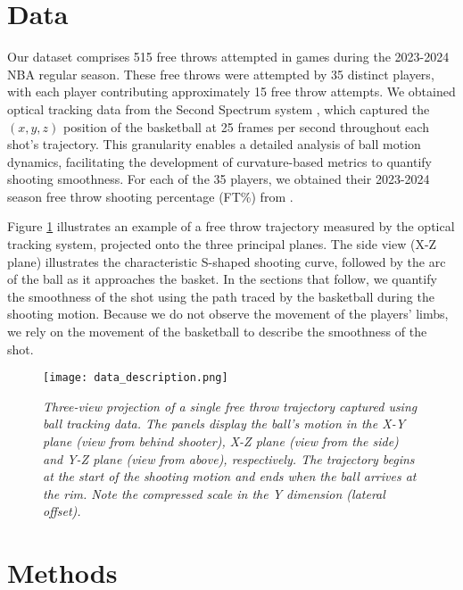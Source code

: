 \documentclass{article}
\begin{document}
  \section{Data}

    Our dataset comprises 515 free throws attempted in games during the 2023-2024 NBA regular season. These free throws were attempted by 35 distinct players, with each player contributing approximately 15 free throw attempts. We obtained optical tracking data from the Second Spectrum system \citep{national_basketball_association_nba_2016}, which captured the $(x, y, z)$ position of the basketball at 25 frames per second throughout each shot's trajectory. This granularity enables a detailed analysis of ball motion dynamics, facilitating the development of curvature-based metrics to quantify shooting smoothness. For each of the 35 players, we obtained their 2023-2024 season free throw shooting percentage (FT\%) from \citet{basketball_reference_2023-24_2024}.

    Figure \ref{fig:data-description} illustrates an example of a free throw trajectory measured by the optical tracking system, projected onto the three principal planes. The side view (X-Z plane) illustrates the characteristic S-shaped shooting curve, followed by the arc of the ball as it approaches the basket. In the sections that follow, we quantify the smoothness of the shot using the path traced by the basketball during the shooting motion. Because we do not observe the movement of the players' limbs, we rely on the movement of the basketball to describe the smoothness of the shot.

    \begin{figure}[H]
        \centering
        \texttt{[image: data\_description.png]}
        \caption{\it Three-view projection of a single free throw trajectory captured using ball tracking data. The panels display the ball's motion in the X-Y plane (view from behind shooter), X-Z plane (view from the side) and Y-Z plane (view from above), respectively. The trajectory begins at the start of the shooting motion and ends when the ball arrives at the rim. Note the compressed scale in the Y dimension (lateral offset).}
        \label{fig:data-description}
      \end{figure}
      
  \section{Methods}
  
\end{document}
